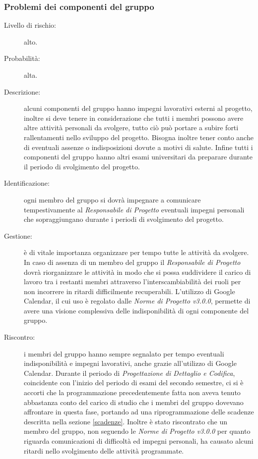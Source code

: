 \subsubsection{Problemi dei componenti del gruppo}
\begin{description}
	\item[Livello di rischio:] alto.
	\item[Probabilità:] alta.
	\item[Descrizione:] alcuni componenti del gruppo hanno impegni lavorativi esterni al progetto, inoltre si deve tenere in considerazione che tutti i membri possono avere altre attività personali da svolgere, tutto ciò può portare a subire forti rallentamenti nello sviluppo del progetto. Bisogna inoltre tener conto anche di eventuali assenze o indisposizioni dovute a motivi di salute. Infine tutti i componenti del gruppo hanno altri esami universitari da preparare durante il periodo di svolgimento del progetto.
	\item[Identificazione:] ogni membro del gruppo si dovrà impegnare a comunicare tempestivamente al \textit{Responsabile di Progetto} eventuali impegni personali che sopraggiungano durante i periodi di svolgimento del progetto. 
	\item[Gestione:] è di vitale importanza organizzare per tempo tutte le attività da svolgere. In caso di assenza di un membro del gruppo il \textit{Responsabile di Progetto} dovrà riorganizzare le attività in modo che si possa suddividere il carico di lavoro tra i restanti membri attraverso l'interscambiabilità dei ruoli per non incorrere in ritardi difficilmente recuperabili. L'utilizzo di \gls{Google Calendar}, il cui uso è regolato dalle \textit{Norme di Progetto v3.0.0}, permette di avere una visione complessiva delle indisponibilità di ogni componente del gruppo. 
	\item[Riscontro:] i membri del gruppo hanno sempre segnalato per tempo eventuali indisponibilità e impegni lavorativi, anche grazie all'utilizzo di \gls{Google Calendar}. Durante il periodo di \textit{Progettazione di Dettaglio e Codifica}, coincidente con l'inizio del periodo di esami del secondo semestre, ci si è accorti che la programmazione precedentemente fatta non aveva tenuto abbastanza conto del carico di studio che i membri del gruppo dovevano affrontare in questa fase, portando ad una riprogrammazione delle scadenze descritta nella sezione \ref{scadenze}. Inoltre è stato riscontrato che un membro del gruppo, non seguendo le \textit{Norme di Progetto v3.0.0} per quanto riguarda comunicazioni di difficoltà ed impegni personali, ha causato alcuni ritardi nello svolgimento delle attività programmate.
\end{description}
